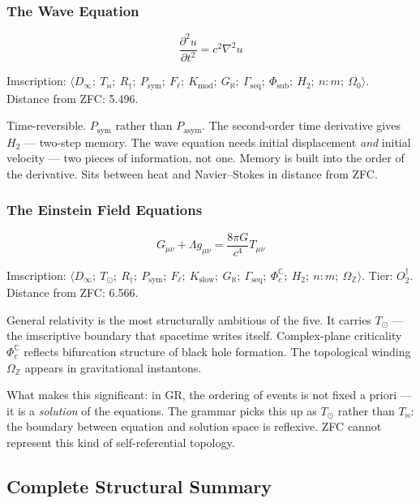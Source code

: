 \documentclass[12pt,a4paper]{article}
\begin{document}
\subsubsection{The Wave Equation}

\[\frac{\partial^2 u}{\partial t^2} = c^2\nabla^2 u\]

Imscription: $\langle D_{\infty};\ T_{\bowtie};\ R_{\dagger};\ P_\text{sym};\ F_{\ell};\ K_\text{mod};\ G_{\aleph};\ \Gamma_\text{seq};\ \Phi_\text{sub};\ H_2;\ n{:}m;\ \Omega_0 \rangle$. Distance from ZFC: 5.496.

Time-reversible. $P_\text{sym}$ rather than $P_\text{asym}$. The second-order time derivative gives $H_2$ --- two-step memory. The wave equation needs initial displacement \emph{and} initial velocity --- two pieces of information, not one. Memory is built into the order of the derivative. Sits between heat and Navier--Stokes in distance from ZFC.

\subsubsection{The Einstein Field Equations}

\[G_{\mu\nu} + \Lambda g_{\mu\nu} = \frac{8\pi G}{c^4}T_{\mu\nu}\]

Imscription: $\langle D_{\infty};\ T_{\odot};\ R_{\dagger};\ P_\text{sym};\ F_{\ell};\ K_\text{slow};\ G_{\aleph};\ \Gamma_\text{seq};\ \Phi_c^\mathbb{C};\ H_2;\ n{:}m;\ \Omega_\mathbb{Z} \rangle$. Tier: $O_2^\dagger$. Distance from ZFC: 6.566.

General relativity is the most structurally ambitious of the five. It carries $T_{\odot}$ --- the imscriptive boundary that spacetime writes itself. Complex-plane criticality $\Phi_c^\mathbb{C}$ reflects bifurcation structure of black hole formation. The topological winding $\Omega_\mathbb{Z}$ appears in gravitational instantons.

What makes this significant: in GR, the ordering of events is not fixed a priori --- it is a \emph{solution} of the equations. The grammar picks this up as $T_{\odot}$ rather than $T_{\bowtie}$: the boundary between equation and solution space is reflexive. ZFC cannot represent this kind of self-referential topology.

\subsection{Complete Structural Summary}
\end{document}
